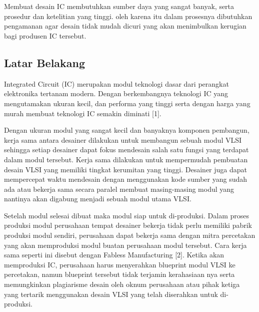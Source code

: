 
\chapter{\babSatu}
Membuat desain IC membutuhkan sumber daya yang sangat banyak, serta prosedur dan ketelitian yang tinggi. oleh karena itu dalam prosesnya dibutuhkan pengamanan agar desain tidak mudah dicuri yang akan menimbulkan kerugian bagi produsen IC tersebut.

% 

\section{Latar Belakang}
Integrated Circuit (IC) merupakan modul teknologi dasar dari perangkat elektronika tertanam modern. Dengan berkembangnya teknologi IC yang mengutamakan ukuran kecil, dan performa yang tinggi serta dengan harga yang murah membuat teknologi IC semakin diminati [1].

Dengan ukuran modul yang sangat kecil dan banyaknya komponen pembangun, kerja sama antara desainer dilakukan untuk membangun sebuah modul VLSI sehingga setiap desainer dapat fokus mendesain salah satu fungsi yang terdapat dalam modul tersebut. Kerja sama dilakukan untuk mempermudah pembuatan desain VLSI yang memiliki tingkat kerumitan yang tinggi. Desainer juga dapat mempercepat waktu mendesain dengan menggunakan kode sumber yang sudah ada atau bekerja sama secara paralel membuat masing-masing modul yang nantinya akan digabung menjadi sebuah modul utama VLSI.

Setelah modul selesai dibuat maka modul siap untuk di-produksi. Dalam proses produksi modul perusahaan tempat desainer bekerja tidak perlu memiliki pabrik produksi modul sendiri, perusahaan dapat bekerja sama dengan mitra percetakan yang akan memproduksi modul buatan perusahaan modul tersebut. Cara kerja sama seperti ini disebut dengan Fabless Manufacturing [2]. Ketika akan memproduksi IC, perusahaan harus menyerahkan blueprint modul VLSI ke percetakan, namun blueprint tersebut tidak terjamin kerahasiaan nya serta memungkinkan plagiarisme desain oleh oknum perusahaan atau pihak ketiga yang tertarik menggunakan desain VLSI yang telah diserahkan untuk di-produksi.

